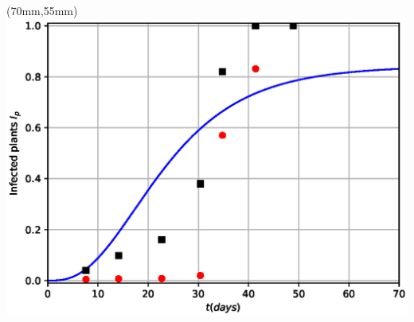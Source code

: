 \begin{frame}
		\begin{textblock*}{50mm}(70mm,55mm)
			\includegraphics[width=\linewidth]{Feathergraphics/Simulation_data.eps}
		\end{textblock*}
	\end{frame}

